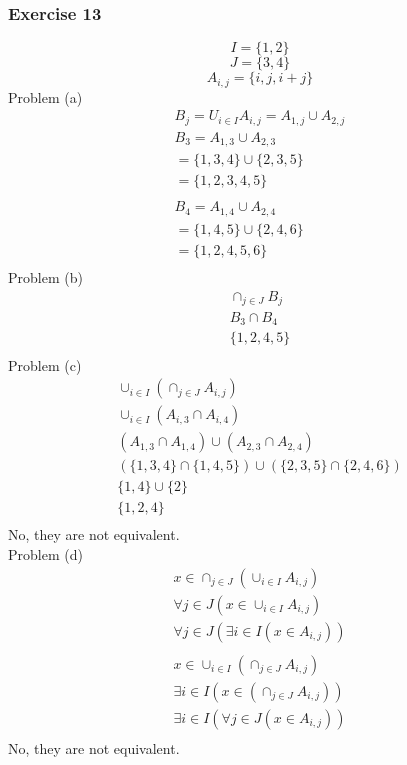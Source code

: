 \subsubsection{Exercise 13}
$$ I = \{1,2\} $$
$$ J = \{3,4\} $$
$$ A_{i,j} = \{i, j, i+j\} $$
Problem (a)
\begin{align}
  B_j = U_{i \in I}A_{i,j} = A_{1,j} \cup A_{2,j} \\
  B_3 = A_{1,3} \cup A_{2,3} \\
  = \{ 1,3,4 \} \cup \{ 2,3,5 \} \\
  = \{1,2,3,4,5\} \\ \\
  B_4 = A_{1,4} \cup A_{2,4} \\
  = \{1,4,5\} \cup \{2,4,6\} \\
  = \{1,2,4,5,6\} \\
\end{align}
Problem (b)
\begin{align*}
  \cap_{j \in J}B_j \\
  B_3 \cap B_4 \\
  \{1,2,4,5\} \\
\end{align*}
Problem (c)
\begin{align*}
  \cup_{i \in I}(\cap_{j \in J}A_{i,j}) \\
  \cup_{i \in I}(A_{i,3} \cap A_{i,4}) \\
  (A_{1,3} \cap A_{1,4}) \cup (A_{2,3} \cap A_{2,4}) \\
  (\{1,3,4\} \cap \{1,4,5\}) \cup (\{2,3,5\} \cap \{2,4,6\}) \\
  \{1,4\} \cup \{2\} \\
  \{1,2,4\} \\
\end{align*}
No, they are not equivalent. \\
Problem (d)
\begin{align*}
  x \in \cap_{j \in J}(\cup_{i \in I}A_{i,j}) \\
  \forall j \in J(x \in \cup_{i \in I}A_{i,j})\\
  \forall j \in J(\exists i \in I(x \in A_{i,j}))\\ \\
  x \in \cup_{i \in I}(\cap_{j \in J}A_{i,j}) \\
  \exists i \in I(x \in (\cap_{j \in J}A_{i,j})) \\
  \exists i \in I(\forall j \in J(x \in A_{i,j}))\\
\end{align*}
  No, they are not equivalent.
